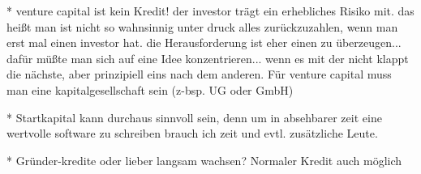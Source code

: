 \documentclass{article}
\begin{document}
* venture capital ist kein Kredit! der investor trägt ein erhebliches Risiko mit. das heißt man ist nicht so wahnsinnig unter druck alles zurückzuzahlen, wenn man erst mal einen investor hat. die Herausforderung ist eher einen zu überzeugen... dafür müßte man sich auf eine Idee konzentrieren... wenn es mit der nicht klappt die nächste, aber prinzipiell eins nach dem anderen. Für venture capital muss man eine kapitalgesellschaft sein (z-bsp. UG oder GmbH)

* Startkapital kann durchaus sinnvoll sein, denn um in absehbarer zeit eine wertvolle software zu schreiben brauch ich zeit und evtl. zusätzliche Leute.

* Gründer-kredite oder lieber langsam wachsen? Normaler Kredit auch möglich 


\pagebreak
\nocite{*}

%
\end{document}

